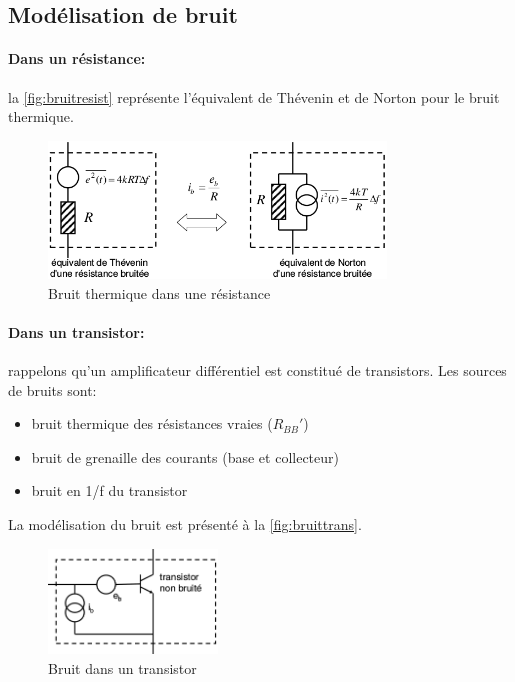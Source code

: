 \subsection{Modélisation de bruit}
\paragraph{Dans un résistance:} la \autoref{fig:bruitresist} représente l'équivalent de Thévenin et de Norton pour le bruit thermique.
\begin{figure}[H] 
	\centering 
	\includegraphics[width=0.8\textwidth,height=10\baselineskip,keepaspectratio]{ch3/image1} 
	\caption{Bruit thermique dans une résistance}
	\label{fig:bruitresist}
\end{figure}
\paragraph{Dans un transistor:} rappelons qu'un amplificateur différentiel est constitué de transistors. Les sources de bruits sont:
\begin{itemize}
	\item bruit thermique des résistances vraies (\(R_{BB}'\))
	\item bruit de grenaille des courants (base et collecteur)
	\item bruit en 1/f du transistor
\end{itemize}
La modélisation du bruit est présenté à la \autoref{fig:bruittrans}.
\begin{figure}[H] 
	\centering 
	\includegraphics[width=0.4\textwidth,height=10\baselineskip,keepaspectratio]{ch3/image2} 
	\caption{Bruit dans un transistor}
	\label{fig:bruittrans}
\end{figure}

